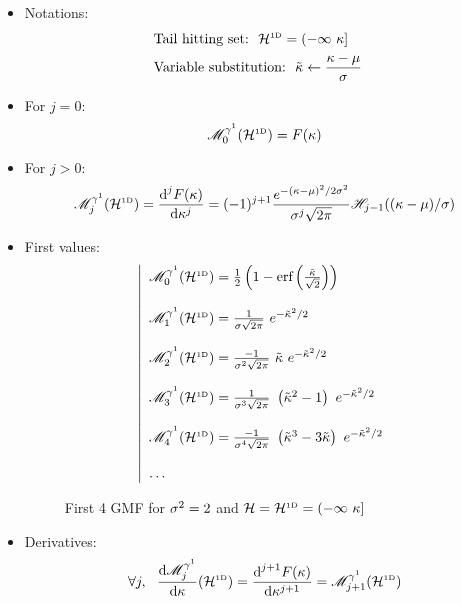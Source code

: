 \documentclass[a4paper,12pt]{article}
\begin{document}
\begin{itemize}
\item Notations:
  \begin{subequations}
    \begin{flalign}
      & \text{Tail hitting set:} \ \ \mathcal{H}^{\text{\tiny1D}}=(-\infty\ \kappa] & \\
      & \text{Variable substitution:} \ \ \tilde{\kappa} \leftarrow \frac{\kappa-\mu}{\sigma} &
    \end{flalign}
  \end{subequations}
\item For $j=0$:
\begin{equation}
  \mathscr{M}^{\gamma^1}_0(\mathcal{H}^{\text{\tiny1D}})=F(\kappa)
\end{equation}
\item For $j>0$:
\begin{equation}
  \mathscr{M}^{\gamma^1}_j(\mathcal{H}^{\text{\tiny1D}})=\frac{\text{d}^jF(\kappa)}{\text{d}\kappa^j}=(-1)^{j+1}\frac{e^{-(\kappa-\mu)^2/2\sigma^2}}{\sigma^j\sqrt{2\pi}}\mathscr{H}_{j-1}((\kappa-\mu)/\sigma)
\end{equation}
\item First values:
\begin{equation}
  \left|
  \begin{array}{l}
    \GMFa_0(\HSC) = \frac{1}{2}\left(1-\erf\left(\frac{\clset}{\sqrt{2}}\right)\right) \\ \\
    \GMFa_1(\HSC) = \frac{1}{\std  \sqrt{2\pi}}\ e^{-\clset^2/2} \\ \\
    \GMFa_2(\HSC) = \frac{-1}{\std^2\sqrt{2\pi}}\ \clset \ e^{-\clset^2/2} \\ \\
    \GMFa_3(\HSC) = \frac{1}{\std^3\sqrt{2\pi}}\ \left(\clset^2-1\right) \ e^{-\clset^2/2} \\ \\
    \GMFa_4(\HSC) = \frac{-1}{\std^4\sqrt{2\pi}}\ \left(\clset^3-3\clset\right) \ e^{-\clset^2/2} \\ \\
    \dots
  \end{array}
  \right.
\end{equation}
\begin{figure}[!h]
  \scalebox{0.9}{}
  \caption{First 4 GMF for $\sigma^2=2$ and $\mathcal{H}=\mathcal{H}^{\text{\tiny1D}}=(-\infty\ \kappa]$}
\end{figure}
\item Derivatives:
\begin{equation}
  \forall j, \ \ \frac{\text{d}\GMFa_j}{\text{d}\lset}(\HSC)=\frac{\text{d}^{j+1}\CDP(\lset)}{\text{d}\lset^{j+1}}=\GMFa_{j+1}(\HSC)
\end{equation}
\end{itemize}
\end{document}
